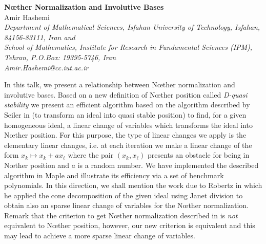 \documentclass[11pt]{article}
\begin{document}
%
\vspace{-0.8cm}
\begin{flushleft}
\Large \textbf{\noindent
N\oe ther Normalization and Involutive Bases}
\\
\vspace{0.5cm}
\normalsize
\normalsize{
 Amir Hashemi
} \\
\vspace{5mm}
\textit{\footnotesize
 Department of Mathematical Sciences, 
Isfahan University of Technology, Isfahan, 84156-83111, Iran and\\
School of Mathematics, Institute for Research in Fundamental
Sciences (IPM), Tehran, P.O.Box: 19395-5746, Iran\\
Amir.Hashemi@cc.iut.ac.ir\\
}
\end{flushleft}
In this talk, we present a relationship between N\oe ther normalization and involutive bases. Based on a new definition of N\oe ther position called {\em D-quasi stability} \cite{hashemi} we present an efficient algorithm based on the algorithm described by Seiler in \cite{wms:comb2} (to transform an ideal into  quasi stable position) to find, for a given homogeneous ideal, a linear change of variables which transforms the ideal into N\oe ther position. For this purpose, the type of linear  changes we apply is the elementary linear changes, i.e. at each iteration we make a linear change of the form $x_k\mapsto x_k+ax_\ell$ where the pair $(x_k,x_\ell)$ presents an obstacle for being in N\oe ther position and $a$ is a random number. We have implemented the described algorithm in {\sc Maple} and illustrate its efficiency via a set of benchmark polynomials. In this direction, we shall mention the work \cite{Daniel} due to Robertz in which he applied the cone decomposition of the given ideal using Janet division to obtain also an sparse linear change of variables for the N\oe ther normalization. Remark that the criterion to get N\oe ther normalization described in \cite{Daniel} is {\em not} equivalent to N\oe ther position, however, our new criterion is equivalent and this may lead to achieve a more sparse linear change of variables.
\end{document}
